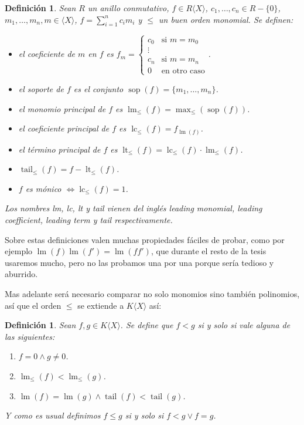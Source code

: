\documentclass[12pt]{report}
\theoremstyle{customstyle}
\newtheorem{definition}[theorem]{Definición}
\theoremstyle{factstyle}
\DeclareMathOperator{\sop}{sop}
\DeclareMathOperator{\lm}{lm}
\DeclareMathOperator{\lc}{lc}
\DeclareMathOperator{\lt}{lt}
\DeclareMathOperator{\tail}{tail}
\begin{document}
\begin{definition}\label{def:cosas de polinomios}
  Sean $R$ un anillo conmutativo, $f ∈ R⟨X⟩$, $c_1, …, c_n ∈ R - \{0\}$, $m_1, …, m_n, m ∈ ⟨X⟩$, $f = ∑_{i = 1}^n c_i m_i$ y $≤$ un buen orden monomial. Se definen:
  \begin{itemize}
    \item el coeficiente de $m$ en $f$ es $f_m = \begin{cases} c_0&\text{si }m = m_0 \\ ⋮ & \\ c_n&\text{si }m = m_n \\ 0&\text{en otro caso} \end{cases} $.
    \item el soporte de $f$ es el conjunto $\sop(f) = \{m_1, …, m_n\}$.
    \item el monomio principal de $f$ es $\lm_≤(f) = \max_≤(\sop(f))$.
    \item el coeficiente principal de $f$ es $\lc_≤(f) = f_{\lm(f)}$.
    \item el término principal de $f$ es $\lt_≤(f) = \lc_≤(f) · \lm_≤(f)$.
    \item $\tail_≤(f) = f - \lt_≤(f)$.
    \item $f$ es mónico $⇔ \lc_≤(f) = 1$.
  \end{itemize}

  Los nombres lm, lc, lt y tail vienen del inglés leading monomial, leading coefficient, leading term y tail respectivamente.
\end{definition}

Sobre estas definiciones valen muchas propiedades fáciles de probar, como por ejemplo $\lm(f) \lm(f') = \lm(f f')$, que durante el resto de la tesis usaremos mucho, pero no las probamos una por una porque sería tedioso y aburrido.

Mas adelante será necesario comparar no solo monomios sino también polinomios, así que el orden $≤$ se extiende a $K⟨X⟩$ así:

\begin{definition}
  Sean $f, g ∈ K⟨X⟩$. Se define que $f < g$ si y solo si vale alguna de las siguientes:
  \begin{enumerate}
    \item $f = 0 ∧ g ≠ 0$.
    \item $\lm_≤(f) < \lm_≤(g)$.
    \item $\lm(f) = \lm(g) ∧ \tail(f) < \tail(g)$.
  \end{enumerate}
  Y como es usual definimos $f ≤ g$ si y solo si $f < g ∨ f = g$.
\end{definition}
\end{document}
